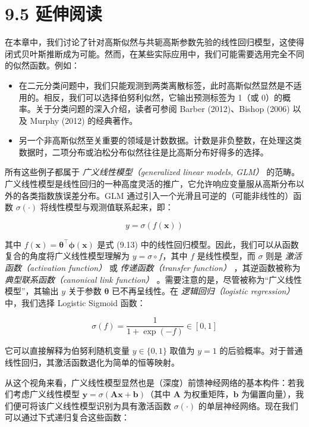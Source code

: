 \section*{9.5 延伸阅读}
\label{sec:9.5}

在本章中，我们讨论了针对高斯似然与共轭高斯参数先验的线性回归模型，这使得闭式贝叶斯推断成为可能。然而，在某些实际应用中，我们可能需要选用完全不同的似然函数。例如：

\begin{itemize}
\item 在二元分类问题中，我们只能观测到两类离散标签，此时高斯似然显然是不适用的。相反，我们可以选择伯努利似然，它输出预测标签为 1（或 0）的概率。关于分类问题的深入介绍，读者可参阅 Barber (2012)、Bishop (2006) 以及 Murphy (2012) 的经典著作。
\item 另一个非高斯似然至关重要的领域是计数数据。计数是非负整数，在处理这类数据时，二项分布或泊松分布似然往往是比高斯分布好得多的选择。
\end{itemize}

所有这些例子都属于 \emph{广义线性模型（generalized linear models, GLM）} 的范畴。广义线性模型是线性回归的一种高度灵活的推广，它允许响应变量服从高斯分布以外的各类指数族误差分布。GLM 通过引入一个光滑且可逆的（可能非线性的）函数 $ \sigma(\cdot) $ 将线性模型与观测值联系起来，即：

\begin{equation*}
y = \sigma(f(\boldsymbol{x}))
\end{equation*}

其中 $ f(\boldsymbol{x}) = \boldsymbol{\theta}^\top \boldsymbol{\phi}(\boldsymbol{x}) $ 是式 (9.13) 中的线性回归模型。因此，我们可以从函数复合的角度将广义线性模型理解为 $ y = \sigma \circ f $，其中 $ f $ 是线性模型，而 $ \sigma $ 则是 \emph{激活函数（activation function）} 或 \emph{传递函数（transfer function）} ，其逆函数被称为 \emph{典型联系函数（canonical link function）} 。需要注意的是，尽管被称为“广义线性模型”，其输出 $ y $ 关于参数 $ \boldsymbol{\theta} $ 已不再呈线性。在 \emph{逻辑回归（logistic regression）} 中，我们选择 Logistic Sigmoid 函数：

\begin{equation*}
\sigma(f) = \frac{1}{1 + \exp(-f)} \in [0, 1]
\end{equation*}

它可以直接解释为伯努利随机变量 $ y \in \{0, 1\} $ 取值为 $ y = 1 $ 的后验概率。对于普通线性回归，其激活函数退化为简单的恒等映射。

从这个视角来看，广义线性模型显然也是（深度）前馈神经网络的基本构件：若我们考虑广义线性模型 $ \boldsymbol{y} = \sigma(\boldsymbol{A}\boldsymbol{x} + \boldsymbol{b}) $（其中 $ \boldsymbol{A} $ 为权重矩阵，$ \boldsymbol{b} $ 为偏置向量），我们便可将该广义线性模型识别为具有激活函数 $ \sigma(\cdot) $ 的单层神经网络。现在我们可以通过下式递归复合这些函数：

